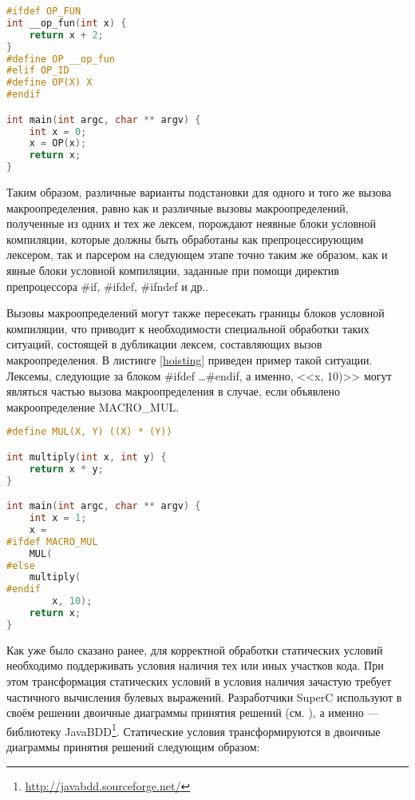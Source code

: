 \begin{minipage}{\linewidth}
\begin{lstlisting}[caption={Различные вызовы макроопределения при различных конфигурациях препроцессора},language=C,label=macrocalls]
#ifdef OP_FUN
int __op_fun(int x) {
	return x + 2;
}
#define OP __op_fun
#elif OP_ID
#define OP(X) X
#endif

int main(int argc, char ** argv) {
	int x = 0;
	x = OP(x);
	return x;	
}
\end{lstlisting}
\end{minipage}

Таким образом, различные варианты подстановки для одного и того же вызова макроопределения, равно как и различные вызовы макроопределений, полученные из одних и тех же лексем, порождают неявные блоки условной компиляции, которые должны быть обработаны как препроцессирующим лексером, так и парсером на следующем этапе точно таким же образом, как и явные блоки условной компиляции, заданные при помощи директив препроцессора \#if, \#ifdef, \#ifndef и др..

Вызовы макроопределений могут также пересекать границы блоков условной компиляции, что приводит к необходимости специальной обработки таких ситуаций, состоящей в дубликации лексем, составляющих вызов макроопределения. В листинге \ref{hoisting} приведен пример такой ситуации. Лексемы, следующие за блоком \#ifdef \dots \#endif, а именно, <<x, 10)>> могут являться частью вызова макроопределения в случае, если объявлено макроопределение MACRO\_MUL.

\begin{minipage}{\linewidth}
\begin{lstlisting}[caption={Вызов макроопределения пересекает границу блока условной компиляции},language=C,label=hoisting]
#define MUL(X, Y) ((X) * (Y))

int multiply(int x, int y) {
	return x * y;
}

int main(int argc, char ** argv) {
	int x = 1;
	x =
#ifdef MACRO_MUL
	MUL(
#else
	multiply(
#endif
		x, 10);
	return x;	
}
\end{lstlisting}
\end{minipage}

Как уже было сказано ранее, для корректной обработки статических условий необходимо поддерживать условия наличия тех или иных участков кода. При этом трансформация статических условий в условия наличия зачастую требует частичного вычисления булевых выражений. Разработчики SuperC используют в своём решении двоичные диаграммы принятия решений (см. \cite{bdd}), а именно --- библиотеку JavaBDD\footnote{\url{http://javabdd.sourceforge.net/}}. Статические условия трансформируются в двоичные диаграммы принятия решений следующим образом:

